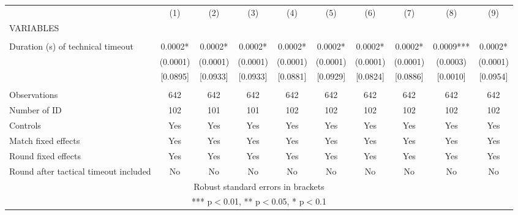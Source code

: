 \documentclass[]{article}
\begin{document}
\begin{tabular}{lccccccccc} \hline
 & (1) & (2) & (3) & (4) & (5) & (6) & (7) & (8) & (9) \\
VARIABLES &  &  &  &  &  &  &  &  &  \\ \hline
 &  &  &  &  &  &  &  &  &  \\
Duration (s) of technical timeout & 0.0002* & 0.0002* & 0.0002* & 0.0002* & 0.0002* & 0.0002* & 0.0002* & 0.0009*** & 0.0002* \\
 & (0.0001) & (0.0001) & (0.0001) & (0.0001) & (0.0001) & (0.0001) & (0.0001) & (0.0003) & (0.0001) \\
 & [0.0895] & [0.0933] & [0.0933] & [0.0881] & [0.0929] & [0.0824] & [0.0886] & [0.0010] & [0.0954] \\
 &  &  &  &  &  &  &  &  &  \\
Observations & 642 & 642 & 642 & 642 & 642 & 642 & 642 & 642 & 642 \\
Number of ID & 102 & 101 & 101 & 102 & 102 & 102 & 102 & 102 & 102 \\
Controls & Yes & Yes & Yes & Yes & Yes & Yes & Yes & Yes & Yes \\
Match fixed effects & Yes & Yes & Yes & Yes & Yes & Yes & Yes & Yes & Yes \\
Round fixed effects & Yes & Yes & Yes & Yes & Yes & Yes & Yes & Yes & Yes \\
 Round after tactical timeout included & No & No & No & No & No & No & No & No & No \\ \hline
\multicolumn{10}{c}{ Robust standard errors in brackets} \\
\multicolumn{10}{c}{ *** p$<$0.01, ** p$<$0.05, * p$<$0.1} \\
\end{tabular}
\end{document}

